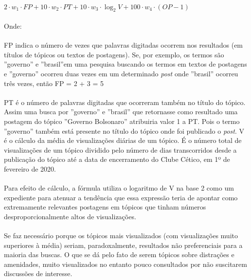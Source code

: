 \documentclass[a4paper,12pt,openany]{book}
\begin{document}
\paragraph{}
$2 \cdot w_{1} \cdot FP + 10 \cdot w_{2} \cdot PT + 10 \cdot w_{3} \cdot \log_2 {V} + 100 \cdot w_{4} \cdot (OP - 1)$
\paragraph{}
Onde:
\paragraph{}
FP indica o número de vezes que palavras digitadas ocorrem nos resultados (em títulos de tópicos ou textos de postagens). Se, por exemplo, os termos são ”governo” e ”brasil”em uma pesquisa buscando os termos em textos de postagens e ”governo” ocorreu duas vezes em um determinado \textit{post} onde ”brasil” ocorreu três vezes, então FP = 2 + 3 = 5
\paragraph{}
PT é o número de palavras digitadas que ocorreram também no título do tópico. Assim uma busca por ”governo” e ”brasil” que retornasse como resultado uma postagem do tópico ”Governo Bolsonaro” atribuiria valor 1 a PT. Pois o termo ”governo” também está presente no título do tópico onde foi publicado o \textit{post}.
V é o cálculo da média de visualizações diárias de um tópico. É o número total de visualizações de um tópico dividido pelo número de dias transcorridos desde a publicação do tópico até a data de encerramento do Clube Cético, em 1º de fevereiro de 2020.
\paragraph{}
Para efeito de cálculo, a fórmula utiliza o logaritmo de V na base 2 como um expediente para atenuar a tendência que essa expressão teria de apontar como extremamente relevantes postagens em tópicos que tinham números desproporcionalmente altos de visualizações.
\paragraph{}
Se faz necessário porque os tópicos mais visualizados (com visualizações muito superiores à média) seriam, paradoxalmente, resultados não preferenciais para a maioria das buscas. O que se dá pelo fato de serem tópicos sobre distrações e amenidades, muito visualizados no entanto pouco consultados por não suscitarem discussões de interesse.
\end{document}
